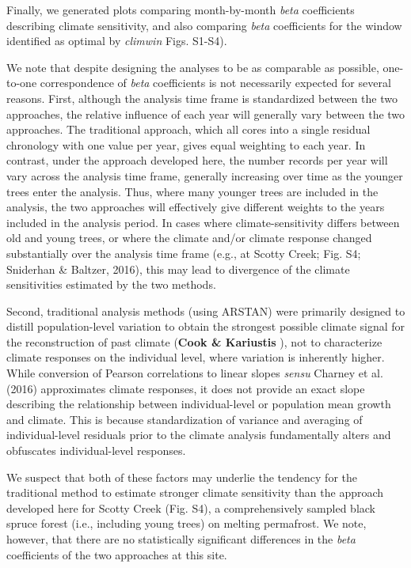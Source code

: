 \documentclass[
]{article}
\begin{document}
Finally, we generated plots comparing month-by-month \emph{beta}
coefficients describing climate sensitivity, and also comparing
\emph{beta} coefficients for the window identified as optimal by
\emph{climwin} Figs. S1-S4).

We note that despite designing the analyses to be as comparable as
possible, one-to-one correspondence of \emph{beta} coefficients is not
necessarily expected for several reasons. First, although the analysis
time frame is standardized between the two approaches, the relative
influence of each year will generally vary between the two approaches.
The traditional approach, which all cores into a single residual
chronology with one value per year, gives equal weighting to each year.
In contrast, under the approach developed here, the number records per
year will vary across the analysis time frame, generally increasing over
time as the younger trees enter the analysis. Thus, where many younger
trees are included in the analysis, the two approaches will effectively
give different weights to the years included in the analysis period. In
cases where climate-sensitivity differs between old and young trees, or
where the climate and/or climate response changed substantially over the
analysis time frame (e.g., at Scotty Creek; Fig. S4; Sniderhan \&
Baltzer, 2016), this may lead to divergence of the climate sensitivities
estimated by the two methods.

Second, traditional analysis methods (using ARSTAN) were primarily
designed to distill population-level variation to obtain the strongest
possible climate signal for the reconstruction of past climate
(\textbf{Cook \& Kariustis }), not to characterize climate responses on
the individual level, where variation is inherently higher. While
conversion of Pearson correlations to linear slopes \emph{sensu} Charney
et al. (2016) approximates climate responses, it does not provide an
exact slope describing the relationship between individual-level or
population mean growth and climate. This is because standardization of
variance and averaging of individual-level residuals prior to the
climate analysis fundamentally alters and obfuscates individual-level
responses.

We suspect that both of these factors may underlie the tendency for the
traditional method to estimate stronger climate sensitivity than the
approach developed here for Scotty Creek (Fig. S4), a comprehensively
sampled black spruce forest (i.e., including young trees) on melting
permafrost. We note, however, that there are no statistically
significant differences in the \emph{beta} coefficients of the two
approaches at this site.
\end{document}

